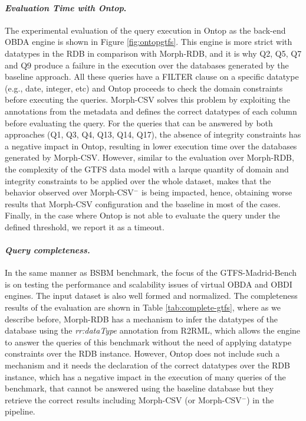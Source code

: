 \noindent\paragraph*{\textit{Evaluation Time with Ontop}.}
The experimental evaluation of the query execution in Ontop as the back-end OBDA engine is shown in Figure \ref{fig:ontopgtfs}. This engine is more strict with datatypes in the RDB in comparison with Morph-RDB, and it is why Q2, Q5, Q7 and Q9 produce a failure in the execution over the databases generated by the baseline approach. All these queries have a FILTER clause on a specific datatype (e.g., date, integer, etc) and Ontop proceeds to check the domain constraints before executing the queries. Morph-CSV solves this problem by exploiting the annotations from the metadata and defines the correct datatypes of each column before evaluating the query. For the queries that can be answered by both approaches (Q1, Q3, Q4, Q13, Q14, Q17), the absence of integrity constraints has a negative impact in Ontop, resulting in lower execution time over the databases generated by Morph-CSV. However, similar to the evaluation over Morph-RDB, the complexity of the GTFS data model with a larque quantity of domain and integrity constraints to be applied over the whole dataset, makes that the behavior observed over Morph-CSV$^-$ is being impacted, hence, obtaining worse results that Morph-CSV configuration and the baseline in most of the cases. Finally, in the case where Ontop is not able to evaluate the query under the defined threshold, we report it as a timeout.

\noindent\paragraph*{\textit{Query completeness.}} In the same manner as BSBM benchmark, the focus of the GTFS-Madrid-Bench is on testing the performance and scalability issues of virtual OBDA and OBDI engines. The input dataset is also well formed and normalized. The completeness results of the evaluation are shown in Table \ref{tab:complete-gtfs}, where as we describe before, Morph-RDB has a mechanism to infer the datatypes of the database using the \textit{rr:dataType} annotation from R2RML, which allows  the engine to answer the queries of this benchmark without the need of applying  datatype constraints over the RDB instance. However, Ontop does not include such a mechanism and it needs the declaration of the correct datatypes over the RDB instance, which has a negative impact in the execution of many queries of the benchmark, that cannot be answered using the baseline database but they retrieve the correct results including Morph-CSV (or Morph-CSV$^-$) in the pipeline.

